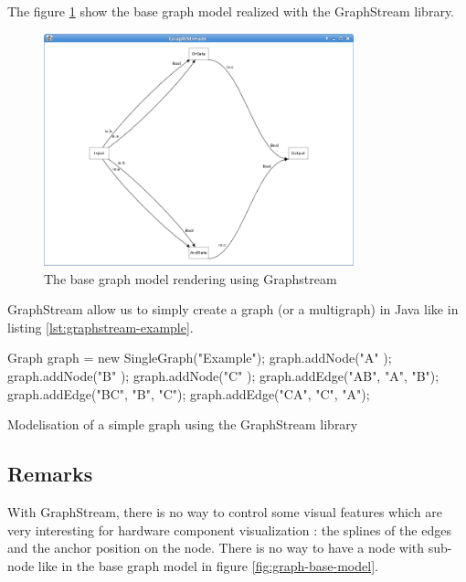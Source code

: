 The figure \ref{fig:base-graph-model-graphstream} show the base graph model
realized with the GraphStream library.

\begin{figure}[H]
  \centering
  \includegraphics[width=0.8\textwidth]{img/graphstream-base-model-example}
  \caption{The base graph model rendering using Graphstream}
  \label{fig:base-graph-model-graphstream}
\end{figure}

GraphStream allow us to simply create a graph (or a multigraph) in Java like in
listing \ref{lst:graphstream-example}.

\begin{listing}[H]
  \centering
  \begin{javacode}
  Graph graph = new SingleGraph("Example");
  graph.addNode("A" );
  graph.addNode("B" );
  graph.addNode("C" );
  graph.addEdge("AB", "A", "B");
  graph.addEdge("BC", "B", "C");
  graph.addEdge("CA", "C", "A");
  \end{javacode}
  \caption[A simple graph modelisation using GraphStream]{Modelisation of a
    simple graph using the GraphStream library}
  \label{lst:graphstream-example}
\end{listing}

\subsection{Remarks}
\label{sub:Remarks}

With GraphStream, there is no way to control some visual features which are very
interesting for hardware component visualization : the splines of the edges and
the anchor position on the node. There is no way to have a node with sub-node
like in the base graph model in figure \ref{fig:graph-base-model}.

